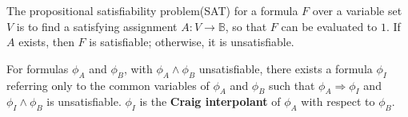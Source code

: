 \documentclass[twocolumn]{article}
\makeatletter
\def\subsection{\@startsection {subsection}{2}{\z@}{16pt plus 2pt minus 2pt}
{6pt plus 2pt minus 2pt}{\normalsize\sl
\edef\@svsec{\thesubsection.\ }}}
\def\thesubsection{\Alph{subsection}}
\makeatother
\begin{document}
The propositional satisfiability problem(SAT) for a formula $F$ over a variable set $V$ 
is to find a satisfying assignment $A:V\to \mathbb{B}$,
so that $F$ can be evaluated to $1$.
If $A$ exists, then $F$ is satisfiable;
otherwise,
it is unsatisfiable.

 




For formulas $\phi_A$ and $\phi_B$,
with $\phi_A\wedge \phi_B$ unsatisfiable,
there exists a formula $\phi_I$ referring only
to the common variables of $\phi_A$ and $\phi_B$ such that $\phi_A\Rightarrow \phi_I$
and $\phi_I\wedge \phi_B$ is unsatisfiable.
$\phi_I$ is the \textbf{Craig interpolant} \cite{Craig} of $\phi_A$ with respect to $\phi_B$.
\end{document}
